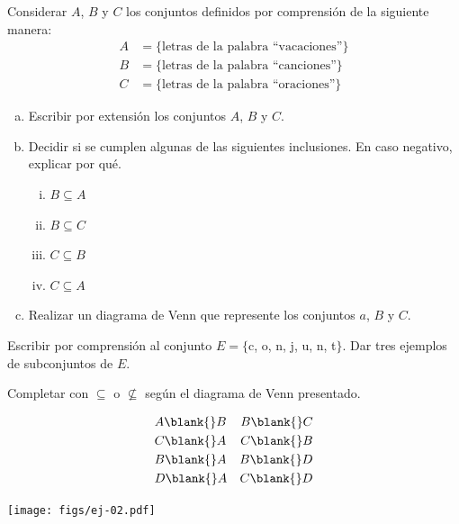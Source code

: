 \documentclass[11pt]{article}
\begin{document}
\begin{exercise}
Considerar $A$, $B$ y $C$ los conjuntos definidos por comprensión de la siguiente manera:
\begin{align*}
    A &= \{\text{letras de la palabra ``vacaciones''} \} \\
    B &= \{\text{letras de la palabra ``canciones''} \} \\
    C &= \{\text{letras de la palabra ``oraciones''} \} 
\end{align*}
\begin{enumerate}[a)]
    \item Escribir por extensión los conjuntos $A$, $B$ y $C$.
    \item Decidir si se cumplen algunas de las siguientes inclusiones. En caso negativo, explicar por qué.
        \begin{multicols}{4}
        \begin{enumerate}[i)]
            \item $B \subseteq A$
            \item $B \subseteq C$
            \item $C \subseteq B$
            \item $C \subseteq A$
        \end{enumerate}
    \end{multicols}
\item Realizar un diagrama de Venn que represente los conjuntos $a$, $B$ y $C$.
\end{enumerate}
\end{exercise}

\begin{exercise}
    Escribir por comprensión al conjunto $E = \{$c, o, n, j, u, n, t$\}$. Dar tres ejemplos de subconjuntos de $E$.
\end{exercise}

\begin{exercise}
Completar con $\subseteq$ o $\nsubseteq$ según el diagrama de Venn presentado.

\begin{minipage}{0.4\textwidth}
\begin{align*}
    &A \blank{} B &B \blank{} C\\
    &C \blank{} A &C \blank{} B\\
    &B \blank{} A &B \blank{} D\\
    &D \blank{} A &C \blank{} D
\end{align*}
\end{minipage}
\hfill
\begin{minipage}{0.5\textwidth}
    \begin{center}
        \texttt{[image: figs/ej-02.pdf]}
    \end{center}
\end{minipage}
\end{exercise}
\end{document}
